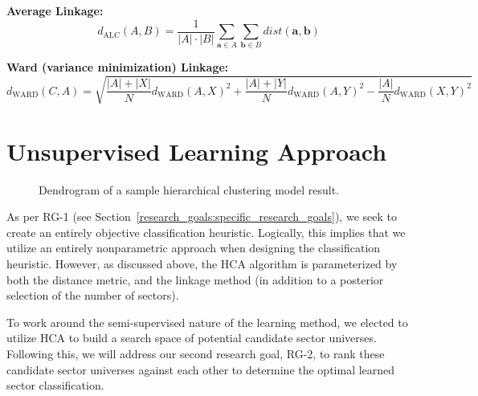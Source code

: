 \documentclass[../main.tex]{subfiles}
\begin{document}
\hspace{7em} \textbf{Average Linkage:}
        $$ d_\text{ALC}(A, B) = \frac{1}{|A| \cdot |B|} \sum_{\boldsymbol{a} \in A} \sum_{\boldsymbol{b} \in B} dist(\boldsymbol{a}, \boldsymbol{b}) $$
    
\hspace{7em} \textbf{Ward (variance minimization) Linkage:}
        $$ d_\text{WARD}(C, A) = \sqrt{ \frac{|A| + |X|}{N} d_\text{WARD}(A, X)^2 + \frac{|A| + |Y|}{N} d_\text{WARD}(A, Y)^2 - \frac{|A|}{N} d_\text{WARD}(X, Y)^2 } $$

\section{Unsupervised Learning Approach}

\begin{figure}
    \centering
    \vspace{\wrapfigadjustment}
    \caption{Dendrogram of a sample hierarchical clustering model result.}
    \label{fig:hierarchical_clustering_model:sample_dendogram}
\end{figure}

As per RG-1 (see Section~\ref{research_goals:specific_research_goals}), we seek to create an entirely objective classification heuristic. Logically, this implies that we utilize an entirely nonparametric approach when designing the classification heuristic. However, as discussed above, the HCA algorithm is parameterized by both the distance metric, and the linkage method (in addition to a posterior selection of the number of sectors).

To work around the semi-supervised nature of the learning method, we elected to utilize HCA to build a search space of potential candidate sector universes. Following this, we will address our second research goal, RG-2, to rank these candidate sector universes against each other to determine the optimal learned sector classification.
\end{document}
